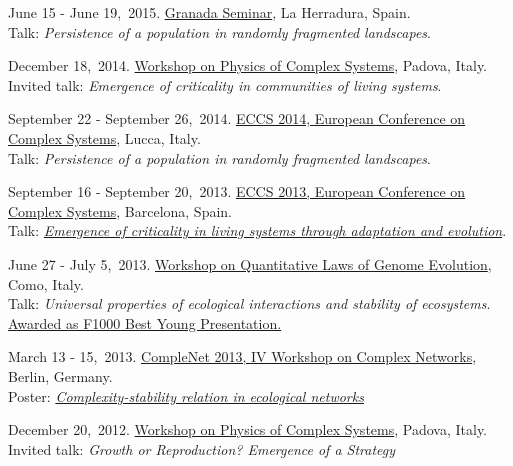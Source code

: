 \documentclass[10pt]{article}
\begin{document}
\begin{outerlist}
    \item June 15 - June 19,~2015.
	 \href{http://ergodic.ugr.es/cp/}{Granada Seminar}, La Herradura, Spain.\\
	Talk: 
	\emph{Persistence of a population in randomly fragmented landscapes}. %

    \item December 18,~2014.
	 \href{http://www.pd.infn.it/~orlandin/Workshops/padova_phd_2014.html}{Workshop on Physics of Complex Systems}, Padova, Italy.\\
	Invited talk: 
	\emph{Emergence of criticality in communities of living systems}. %


    \item September 22 - September 26,~2014.
	 \href{http://www.eccs14.eu/}{ECCS 2014, European Conference on Complex Systems}, Lucca, Italy.\\
	Talk: 
	\emph{Persistence of a population in randomly fragmented landscapes}. %
	

    \item September 16 - September 20,~2013.
	 \href{http://www.eccs13.eu/}{ECCS 2013, European Conference on Complex Systems}, Barcelona, Spain.\\
	Talk: \href{http://dl.dropbox.com/u/2794177/cv_attachment/13barcelona.pdf}{
	\emph{Emergence of criticality in living systems through adaptation and evolution}}. %
	

    \item June 27 - July 5,~2013.
	 \href{http://www.complexcomolake.it/quantitativelaws/}{Workshop on Quantitative Laws of Genome Evolution}, Como, Italy.\\
	Talk: 
	\emph{Universal properties of ecological interactions and stability of ecosystems}. \\ %
	\underline{Awarded as F1000 Best Young Presentation.}	


    \item March 13 - 15,~2013.
	 \href{http://complenet.org/CompleNet_2013/Home.html}{CompleNet 2013, IV Workshop on Complex Networks}, Berlin, Germany.\\
	Poster: \href{http://dl.dropbox.com/u/2794177/cv_attachment/13berlin.pdf}{
	\emph{Complexity-stability relation in ecological networks}}

    \item December 20,~2012.
	 \href{http://www.pd.infn.it/~orlandin/Workshops/padova_phd_2012.html}{Workshop on Physics of Complex Systems}, Padova, Italy.\\
	Invited talk: 
	\emph{Growth or Reproduction? Emergence of a Strategy} %


\end{outerlist}
\end{document}
